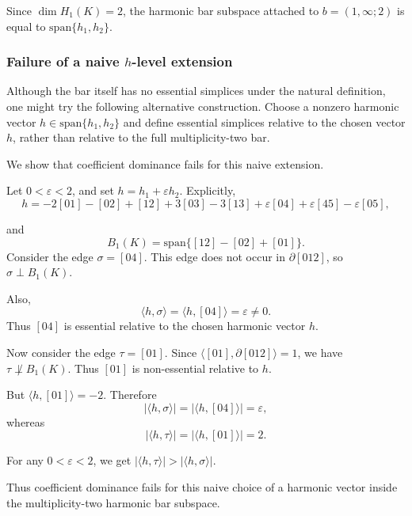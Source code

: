 \documentclass[11pt]{amsart}
\theoremstyle{theorem}
\theoremstyle{remark}
\theoremstyle{definition}
\begin{document}
Since $
\dim H_1(K)=2
$,
the harmonic bar subspace attached to
$
b=(1,\infty;2)
$
is equal to
$
\mathrm{span}\{h_1,h_2\}
$.

\subsubsection{Failure of a naive \(h\)-level extension}
Although the bar itself has no essential simplices under the natural definition,
one might try the following alternative construction. Choose a nonzero
harmonic vector
$
h\in\mathrm{span}\{h_1,h_2\}
$
and define essential simplices relative to the chosen vector \(h\), rather than
relative to the full multiplicity-two bar.

We show that coefficient dominance fails for this naive extension.

Let
$
0<\varepsilon<2
$,
and set
$
h=h_1+\varepsilon h_2
$.
Explicitly,
\[
h
=
-2[01]-[02]+[12]+3[03]-3[13]
+\varepsilon[04]+\varepsilon[45]-\varepsilon[05],
\]

and
\[
B_1(K)=\mathrm{span}\{[12]-[02]+[01]\}.
\]
Consider the edge
$
\sigma=[04]
$.
This edge does not occur in \(\partial[012]\), so
$
\sigma\perp B_1(K)
$.

Also,
\[
\langle h,\sigma\rangle
=
\langle h,[04]\rangle
=
\varepsilon
\neq 0.
\]
Thus \([04]\) is essential relative to the chosen harmonic vector \(h\).

Now consider the edge
$
\tau=[01]
$.
Since
$
\langle [01],\partial[012]\rangle=1
$,
we have
$
\tau\not\perp B_1(K)
$.
Thus \([01]\) is non-essential relative to \(h\).

But
$
\langle h,[01]\rangle=-2
$.
Therefore
\[
|\langle h,\sigma\rangle|
=
|\langle h,[04]\rangle|
=
\varepsilon,
\]
whereas
\[
|\langle h,\tau\rangle|
=
|\langle h,[01]\rangle|
=
2.
\]

For any
$
0<\varepsilon<2
$,
we get
$
|\langle h,\tau\rangle|
>
|\langle h,\sigma\rangle|
$.

Thus coefficient dominance fails for this naive choice of a harmonic vector
inside the multiplicity-two harmonic bar subspace.
\end{document}

